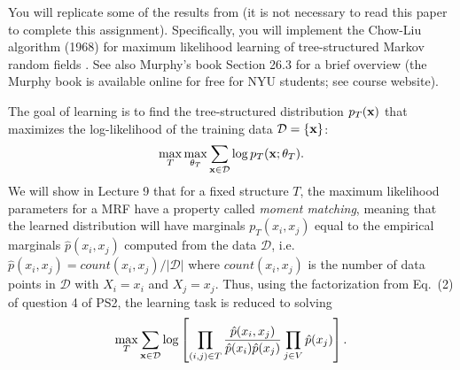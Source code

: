 \documentclass{article}
\begin{document}
\begin{enumerate}
You will replicate some of the results from
\cite{choi_cvpr10} (it is not necessary to read this paper to complete
this assignment).
Specifically, you will implement the Chow-Liu
  algorithm (1968) for maximum likelihood learning of tree-structured
  Markov random fields \cite{Chow68approximatingdiscrete}. See also
  Murphy's book Section 26.3 for a brief overview (the
  Murphy book is available online for free for NYU students; see course website).

The goal of learning is to find the tree-structured distribution $p_T({\bf x})$ that maximizes the log-likelihood of the training data $\mathcal{D}=\{ {\bf x} \}$:
$$
\max_T \max_{\theta_T} \sum_{{\bf x}\in \mathcal{D}} \log p_T({\bf x}; \theta_T).
$$
We will show in Lecture 9 that for a fixed structure $T$, the maximum
likelihood parameters for a MRF have a property called {\em moment
  matching}, meaning that the learned distribution will have marginals
$p_T(x_i,x_j)$ equal to the empirical marginals $\hat{p}(x_i,x_j)$
computed from the data $\mathcal{D}$, i.e. $\hat{p}(x_i,x_j) =
count(x_i,x_j)/|\mathcal{D}|$ where $count(x_i,x_j)$ is the number of
data points in $\mathcal{D}$ with $X_i=x_i$ and $X_j=x_j$. Thus, using
the factorization from Eq.~(2) of question 4 of PS2, the learning task is reduced to solving
$$
\max_T \sum_{{\bf x}\in \mathcal{D}} \log\left[
\prod_{(i,j)\in T}\frac{\hat{p}(x_i,x_j)}{\hat{p}(x_i)\hat{p}(x_j)}\prod_{j\in V} \hat{p}(x_j)
\right].
$$
\begin{figure}[t]
\centering

\end{figure}
\end{enumerate}
\end{document}
